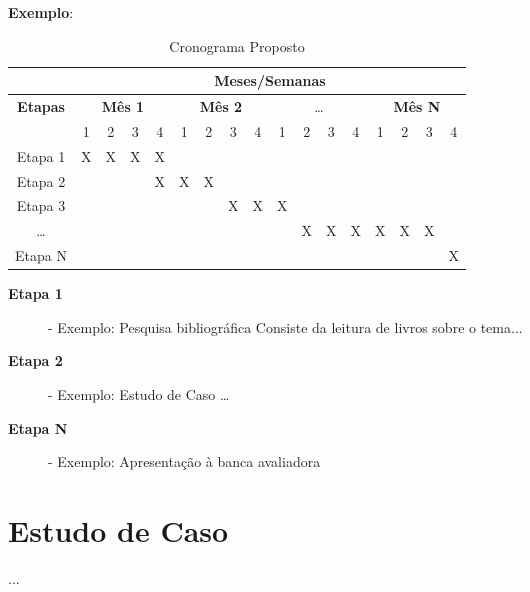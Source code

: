 \textbf{Exemplo}:

\begin{table}[h]
\caption{Cronograma Proposto}
\begin{tabular}{|c|c|c|c|c|c|c|c|c|c|c|c|c|c|c|c|c|}
\hline
& \multicolumn{16}{c|}{\textbf{Meses/Semanas}} \\
\hline
\multirow{2}{*}{\textbf{Etapas}} & \multicolumn{4}{c|}{\textbf{Mês 1}} & \multicolumn{4}{c|}{\textbf{Mês 2}} & \multicolumn{4}{c|}{\ldots} & \multicolumn{4}{c|}{\textbf{Mês N}}  \\
\cline{2-17}
        & 1 & 2 & 3 & 4 & 1 & 2 & 3 & 4 & 1 & 2 & 3 & 4 & 1 & 2 & 3 & 4 \\
\hline        
Etapa 1 & X & X & X & X &   &   &   &   &   &   &   &   &   &   &   &  \\
\hline 
Etapa 2 &   &   &   & X & X & X &   &   &   &   &   &   &   &   &   &  \\ 
\hline
Etapa 3 &   &   &   &   &   &   & X & X & X &   &   &   &   &   &   &  \\
\hline 
\ldots  &   &   &   &   &   &   &   &   &   & X & X & X & X & X & X &  \\ 
\hline
Etapa N &   &   &   &   &   &   &   &   &   &   &   &   &   &   &   & X \\
\hline 
\end{tabular}
\label{tab:Cronograma}
\end{table}
\begin{description}
\item [\textbf{Etapa 1}] - Exemplo: Pesquisa bibliográfica
Consiste da leitura de livros sobre o tema...
\item [\textbf{Etapa 2}] - Exemplo: Estudo de Caso
\ldots
\item[\textbf{Etapa N}] - Exemplo: Apresentação à banca avaliadora
\end{description}


\section{Estudo de Caso}
...
